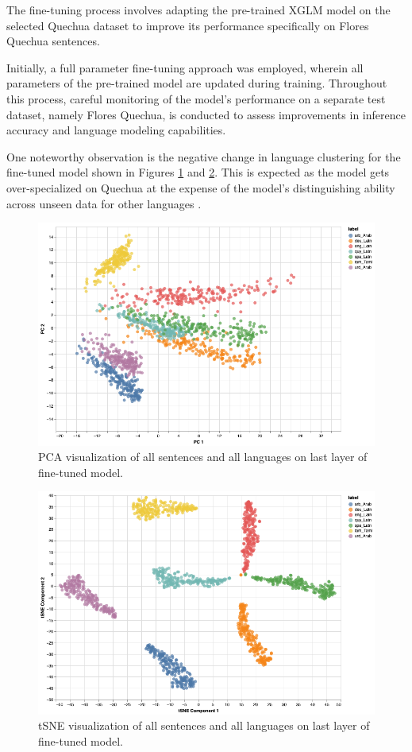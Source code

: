 \documentclass[11pt]{article}
\begin{document}
The fine-tuning process involves adapting the pre-trained XGLM model on the selected Quechua dataset to improve its performance specifically on Flores Quechua sentences. 

Initially, a full parameter fine-tuning approach was employed, wherein all parameters of the pre-trained model are updated during training. Throughout this process, careful monitoring of the model's performance on a separate test dataset, namely Flores Quechua, is conducted to assess improvements in inference accuracy and language modeling capabilities. 

One noteworthy observation is the negative change in language clustering for the fine-tuned model shown in Figures \ref{vis_ft_pca} and \ref{vis_ft_tSNE}. This is expected as the model gets over-specialized on Quechua at the expense of the model's distinguishing ability across unseen data for other languages .


\begin{figure}[ht]
\centering
\includegraphics[width=0.9\columnwidth]{visualization_ft_pca.png}
\caption{PCA visualization of all sentences and all
languages on last layer of fine-tuned model.}
\label{vis_ft_pca}
\end{figure}


\begin{figure}[ht]
\centering
\includegraphics[width=0.9\columnwidth]{visualization_ft_tsne.png}
\caption{tSNE visualization of all sentences and all
languages on last layer of fine-tuned model.}
\label{vis_ft_tSNE}
\end{figure}
\end{document}
